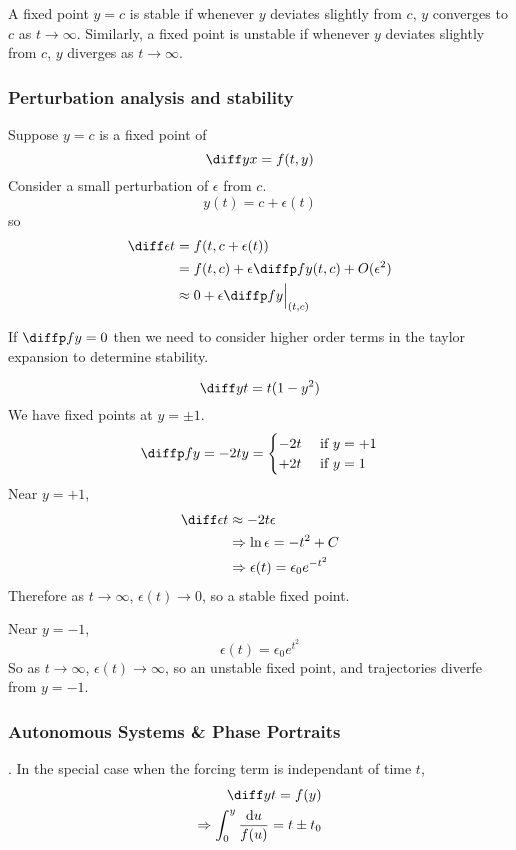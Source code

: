 \documentclass{article}
\begin{document}
\begin{defi}
    A fixed point $y = c$ is stable if whenever $y$ deviates slightly from $c$, $y$ converges to $c$ as $t \rightarrow \infty$.
    Similarly, a fixed point is unstable if whenever $y$ deviates slightly from $c$, $y$ diverges as $t \rightarrow \infty$.
\end{defi}
\subsubsection{Perturbation analysis and stability}
Suppose $y = c$ is a fixed point of 
\[
    \diff yx = f(t, y)
\]
Consider a small perturbation of $\epsilon$ from $c$.
\[
    y(t) = c + \epsilon(t)
\]
so
\begin{align*}
    \diff \epsilon t &= f(t, c + \epsilon(t)) \\
    &= f(t, c) + \epsilon \diffp fy (t, c) + O(\epsilon^2) \\
    &\approx 0 + \epsilon \diffp fy \eval{(t, c)}{}
\end{align*}
\begin{remark}
    If $\diffp fy = 0$ then we need to consider higher order terms in the taylor expansion to determine stability.
\end{remark}
\begin{eg}
    \[
        \diff yt = t(1 - y^2)
    \]
    We have fixed points at $y = \pm 1$.
    \[
        \diffp fy = -2ty = \begin{cases}
            -2t & \text{ if } y = + 1 \\
            +2t & \text{ if } y = 1
        \end{cases}  
    \]
    Near $y = +1$,
    \begin{align*}
        \diff \epsilon t &\approx -2t \epsilon \\
        &\Rightarrow \ln \epsilon = - t^2 + C  \\
        &\Rightarrow \epsilon(t) = \epsilon_0 e^{-t^2}
    \end{align*}
    Therefore as $t \rightarrow \infty$, $\epsilon(t) \rightarrow 0$, so a stable fixed point.

    Near $y = -1$, 
    \[  
        \epsilon(t) = \epsilon_0 e^{t^2}
    \]
    So as $t \rightarrow \infty$, $\epsilon(t) \rightarrow \infty$, so an unstable fixed point,
    and trajectories diverfe from $y = -1$.
\end{eg}

\subsubsection{Autonomous Systems \& Phase Portraits}.
In the special case when the forcing term is independant of time $t$,
\begin{align*}
    \diff yt = f(y) \\
    \Rightarrow \int_{0}^{y}{\frac{\diffd u}{f(u)}} = t \pm t_0
\end{align*}
\end{document}
